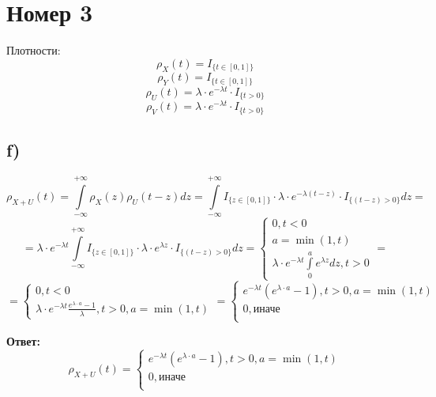 \documentclass[a4paper,12pt]{article}
\begin{document}
\section*{Номер 3}
Плотности:
\[
\rho_X(t) = I_{\{t \in [0, 1]\}}
\]
\[
\rho_Y(t) = I_{\{t \in [0, 1]\}}
\]
\[
\rho_U(t) = 
\lambda \cdot e^{-\lambda t} \cdot I_{\{t > 0\}}
\]
\[
\rho_V(t) = 
\lambda \cdot e^{-\lambda t} \cdot I_{\{t > 0\}}
\]
\subsection*{f)}
\[
\rho_{X+U}(t) = \int\limits_{-\infty}^{+\infty} \rho_X(z) \rho_U(t-z) dz =
\int\limits_{-\infty}^{+\infty}I_{\{z \in [0, 1]\}} \cdot \lambda \cdot e^{-\lambda (t-z)} \cdot I_{\{(t-z) > 0\}}dz   =
\]
\[
=
\lambda \cdot e^{-\lambda t} 
\int\limits_{-\infty}^{+\infty}I_{\{z \in [0, 1]\}} \cdot \lambda \cdot e^{\lambda z} \cdot I_{\{(t-z) > 0\}}dz 
=
\begin{cases}
0, t < 0 \\
a = \min (1, t) \\
\lambda \cdot e^{-\lambda t} \int\limits_0^{a} e^{\lambda z} dz, t > 0
\end{cases} = 
\]
\[
=
\begin{cases}
0, t < 0 \\
\lambda \cdot e^{-\lambda t} \frac{e^{\lambda \cdot a} -1 }{\lambda}, t > 0, a = \min (1, t)
\end{cases}
=
\begin{cases}
e^{-\lambda t} (e^{\lambda \cdot a} -1) , t > 0, a = \min (1, t) \\
0, \text{иначе}  \\
\end{cases}
\]
\begin{center}
\textbf{Ответ: } 
\[
\rho_{X+U}(t) 
=
\begin{cases}
e^{-\lambda t} (e^{\lambda \cdot a} -1) , t > 0, a = \min (1, t) \\
0, \text{иначе}  \\
\end{cases}
\]
\end{center}
\end{document}
